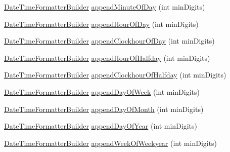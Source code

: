 \begin{DoxyCompactItemize}
\hyperlink{classorg_1_1joda_1_1time_1_1format_1_1_date_time_formatter_builder}{Date\-Time\-Formatter\-Builder} \hyperlink{classorg_1_1joda_1_1time_1_1format_1_1_date_time_formatter_builder_ab257be2b351332bcdb18aee816d189c2}{append\-Minute\-Of\-Day} (int min\-Digits)
\item 
\hyperlink{classorg_1_1joda_1_1time_1_1format_1_1_date_time_formatter_builder}{Date\-Time\-Formatter\-Builder} \hyperlink{classorg_1_1joda_1_1time_1_1format_1_1_date_time_formatter_builder_ad4d3ba441d06862b5f1d2c77ca37f2af}{append\-Hour\-Of\-Day} (int min\-Digits)
\item 
\hyperlink{classorg_1_1joda_1_1time_1_1format_1_1_date_time_formatter_builder}{Date\-Time\-Formatter\-Builder} \hyperlink{classorg_1_1joda_1_1time_1_1format_1_1_date_time_formatter_builder_af8f05fe07a685055fe3a6fd0c670acd8}{append\-Clockhour\-Of\-Day} (int min\-Digits)
\item 
\hyperlink{classorg_1_1joda_1_1time_1_1format_1_1_date_time_formatter_builder}{Date\-Time\-Formatter\-Builder} \hyperlink{classorg_1_1joda_1_1time_1_1format_1_1_date_time_formatter_builder_a4039d22549956b4b7bb77a8f819685bf}{append\-Hour\-Of\-Halfday} (int min\-Digits)
\item 
\hyperlink{classorg_1_1joda_1_1time_1_1format_1_1_date_time_formatter_builder}{Date\-Time\-Formatter\-Builder} \hyperlink{classorg_1_1joda_1_1time_1_1format_1_1_date_time_formatter_builder_a84b84adf181a620da1749baf2d929c24}{append\-Clockhour\-Of\-Halfday} (int min\-Digits)
\item 
\hyperlink{classorg_1_1joda_1_1time_1_1format_1_1_date_time_formatter_builder}{Date\-Time\-Formatter\-Builder} \hyperlink{classorg_1_1joda_1_1time_1_1format_1_1_date_time_formatter_builder_a04482d79ce0fff1a8775e2bdcb290726}{append\-Day\-Of\-Week} (int min\-Digits)
\item 
\hyperlink{classorg_1_1joda_1_1time_1_1format_1_1_date_time_formatter_builder}{Date\-Time\-Formatter\-Builder} \hyperlink{classorg_1_1joda_1_1time_1_1format_1_1_date_time_formatter_builder_a15f5966300ae1d839f314d301e8ea5d3}{append\-Day\-Of\-Month} (int min\-Digits)
\item 
\hyperlink{classorg_1_1joda_1_1time_1_1format_1_1_date_time_formatter_builder}{Date\-Time\-Formatter\-Builder} \hyperlink{classorg_1_1joda_1_1time_1_1format_1_1_date_time_formatter_builder_a7aba18a437a53598df3b322f36e4b487}{append\-Day\-Of\-Year} (int min\-Digits)
\item 
\hyperlink{classorg_1_1joda_1_1time_1_1format_1_1_date_time_formatter_builder}{Date\-Time\-Formatter\-Builder} \hyperlink{classorg_1_1joda_1_1time_1_1format_1_1_date_time_formatter_builder_a2e34310ad003620a28f6299547678269}{append\-Week\-Of\-Weekyear} (int min\-Digits)

\end{DoxyCompactItemize}

